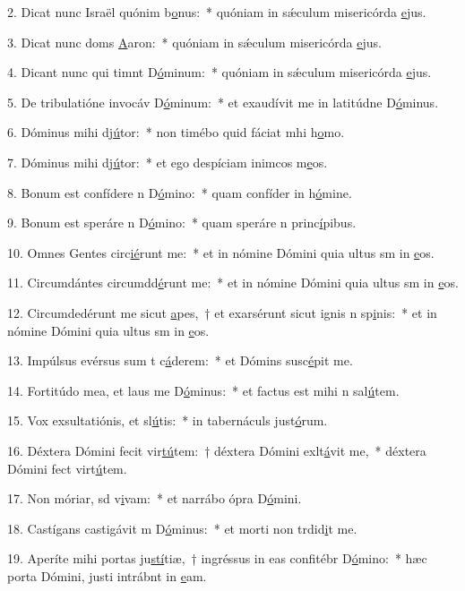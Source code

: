 2. Dicat nunc Israël quónim b\uline{o}nus:~* quóniam in sǽculum misericórda \uline{e}jus.\par 
3. Dicat nunc doms \uline{A}aron:~* quóniam in sǽculum misericórda \uline{e}jus.\par 
4. Dicant nunc qui timnt D\uline{ó}minum:~* quóniam in sǽculum misericórda \uline{e}jus.\par 
5. De tribulatióne invocáv D\uline{ó}minum:~* et exaudívit me in latitúdne D\uline{ó}minus.\par 
6. Dóminus mihi dj\uline{ú}tor:~* non timébo quid fáciat mhi h\uline{o}mo.\par 
7. Dóminus mihi dj\uline{ú}tor:~* et ego despíciam inimcos m\uline{e}os.\par 
8. Bonum est confídere n D\uline{ó}mino:~* quam confíder in h\uline{ó}mine.\par 
9. Bonum est speráre n D\uline{ó}mino:~* quam speráre n princ\uline{í}pibus.\par 
10. Omnes Gentes circ\uline{ié}runt me:~* et in nómine Dómini quia ultus sm in \uline{e}os.\par 
11. Circumdántes circumdd\uline{é}runt me:~* et in nómine Dómini quia ultus sm in \uline{e}os.\par 
12. Circumdedérunt me sicut \uline{a}pes,~† et exarsérunt sicut ignis n sp\uline{i}nis:~* et in nómine Dómini quia ultus sm in \uline{e}os.\par 
13. Impúlsus evérsus sum t c\uline{á}derem:~* et Dómins susc\uline{é}pit me.\par 
14. Fortitúdo mea, et laus me D\uline{ó}minus:~* et factus est mihi n sal\uline{ú}tem.\par 
15. Vox exsultatiónis, et sl\uline{ú}tis:~* in tabernáculs just\uline{ó}rum.\par 
16. Déxtera Dómini fecit vir\uline{tú}tem:~† déxtera Dómini exlt\uline{á}vit me,~* déxtera Dómini fect virt\uline{ú}tem.\par 
17. Non móriar, sd v\uline{i}vam:~* et narrábo ópra D\uline{ó}mini.\par 
18. Castígans castigávit m D\uline{ó}minus:~* et morti non trdid\uline{i}t me.\par 
19. Aperíte mihi portas ju\uline{stí}tiæ,~† ingréssus in eas confitébr D\uline{ó}mino:~* hæc porta Dómini, justi intrábnt in \uline{e}am.\par 
